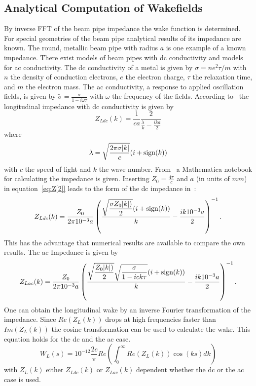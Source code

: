 \documentclass[11pt,a4paper]{article}
\newcommand {\sign}{\mathop {\rm sign}}
\begin{document}
\subsection{Analytical Computation of Wakefields}
\label{sec:analytically_W_Calc}
By inverse  FFT of the beam pipe impedance the wake function is determined. For special geometries of the beam pipe analytical results of its impedance are known. The round, metallic beam pipe with radius $a$ is one example of a known impedance. There exist models of beam pipes with dc conductivity and models for ac conductivity. The dc conductivity of a metal is given by $\sigma = ne^2\tau/m$ with $n$ the density of conduction electrons, $e$ the electron charge, $\tau$ the relaxation time, and $m$ the electron mass. The ac conductivity, a response to applied oscillation fields, is given by $\tilde{\sigma} = \frac{\sigma} {1-i\omega\tau}$ with $\omega$ the frequency of the fields. According to~\cite{wake} the longitudinal impedance with dc conductivity is given by
\begin{equation}  \label{eq:Z[2]}
 Z_{Ldc}(k) = \dfrac{1}{ca} \dfrac{2}{\frac{\lambda}{k}-\frac{ika}{2}}
\end{equation}
where
\begin{equation}
\lambda=\sqrt{\dfrac{2\pi\sigma |k|}{c}}(i+\sign(k))
\end{equation}
with $c$ the speed of light and $k$ the wave number. From~\cite{notebook} a Mathematica notebook for calculating the impedance is given. Inserting $Z_0=\frac{4\pi}{c}$ and $a$ (in units of $mm$) in equation~\eqref{eq:Z[2]} leads to the form of the dc impedance in~\cite{notebook}:
\begin{equation}
  Z_{Ldc}(k) = \dfrac{Z_0}{2\pi10^{-3}a} \left( \dfrac{ \sqrt{\dfrac{\sigma Z_0|k|)}{2}} (i+\sign(k))}{k} -\dfrac{ik10^{-3}a}{2}\right)^{-1}.
\end{equation}
This has the advantage that numerical results are available to compare the own results.
The ac Impedance is given by~\cite{notebook}
\begin{equation} \label{eq:AC_Imp}
Z_{Lac}(k) = \dfrac{Z_0}{2\pi10^{-3}a} \left(\dfrac{ \sqrt{\dfrac{Z_0|k|)}{2}} \sqrt{\dfrac{\sigma}{1-ick\tau}} (i+\sign(k))} {k} -\dfrac{ik10^{-3}a}{2}\right)^{-1}.
\end{equation}
One can obtain the longitudinal wake by an inverse Fourier transformation of the impedance. Since $Re(Z_L(k))$ drops at high frequencies faster than $Im(Z_L(k))$ the cosine transformation can be used to calculate the wake. This equation holds for the dc and the ac case.
\begin{equation} \label{eq:Calc_Wl}
W_L(s)=10^{-12} \dfrac{2c}{\pi}Re\left(\int_0^\infty Re(Z_L(k))\cos (ks)dk\right)
\end{equation}
with $Z_L(k)$ either $Z_{Ldc}(k)$ or $Z_{Lac}(k)$ dependent whether the dc or the ac case is used.
\end{document}
